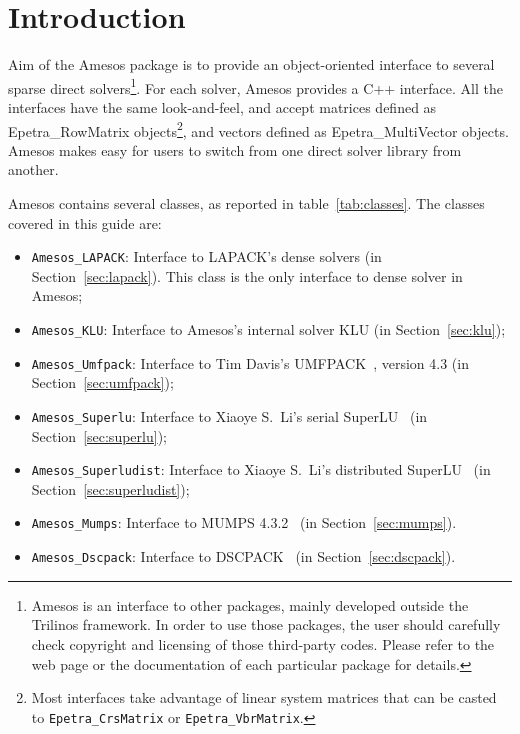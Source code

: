 \documentclass[11pt]{SANDreport}
\newcommand{\amesos}{{\sc Amesos}}
\begin{document}
\section{Introduction}
\label{sec:intro}

Aim of the Amesos package is to provide an object-oriented interface to
several sparse direct solvers\footnote{Amesos is an interface to other
  packages, mainly developed outside the Trilinos framework. In order to
  use those packages, the user should carefully check copyright and
  licensing of those third-party codes.  Please refer to the web page or
  the documentation of each particular package for details.}. For each
solver, Amesos provides a C++ interface. All the interfaces have the
same look-and-feel, and accept matrices defined as Epetra\_RowMatrix
objects\footnote{Most interfaces take advantage of linear system matrices 
  that can be casted to {\tt Epetra\_CrsMatrix} or {\tt Epetra\_VbrMatrix}.}, 
  and vectors defined as Epetra\_MultiVector objects. Amesos
makes easy for users to switch from one direct solver library from
another.

Amesos contains several classes, as reported in table~\ref{tab:classes}.
The classes covered in this guide are:
\begin{itemize}
\item \verb!Amesos_LAPACK!: Interface to LAPACK's dense solvers (in
  Section~\ref{sec:lapack}). This class is the only interface to
  dense solver in \amesos;
\item \verb!Amesos_KLU!: Interface to Amesos's internal solver KLU (in
  Section~\ref{sec:klu});
\item \verb!Amesos_Umfpack!: Interface to Tim Davis's
  UMFPACK~\cite{umfpack-home-page}, version 4.3 (in Section~\ref{sec:umfpack});
\item \verb!Amesos_Superlu!: Interface to Xiaoye S.~Li's serial
  SuperLU~\cite{superlu-home-page} (in Section~\ref{sec:superlu});
\item \verb!Amesos_Superludist!: Interface to Xiaoye S.~Li's distributed
  SuperLU~\cite{superlu-home-page} (in Section~\ref{sec:superludist});
\item \verb!Amesos_Mumps!: Interface to MUMPS
  4.3.2~\cite{mumps-home-page} (in Section~\ref{sec:mumps}).
\item \verb!Amesos_Dscpack!: Interface to DSCPACK~\cite{dscpack-manual} 
(in Section~\ref{sec:dscpack}).
\end{itemize}
\end{document}
